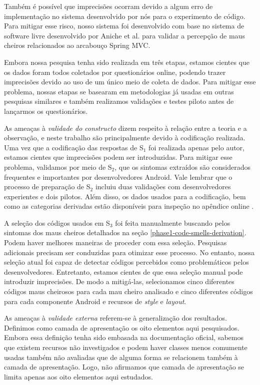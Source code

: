 Também é possível que imprecisões ocorram devido a algum erro de implementação no sistema desenvolvido por nós para o experimento de código. Para mitigar esse risco, nosso sistema foi desenvolvido com base no sistema de software livre desenvolvido por Aniche et al. \cite{AnicheSmellsMVC:17, MvcSmells:16} para validar a percepção de maus cheiros relacionados ao arcabouço Spring MVC. 

Embora nossa pesquisa tenha sido realizada em três etapas, estamos cientes que os dados foram todos coletados por questionários online, podendo trazer imprecisões devido ao uso de um único meio de coleta de dados. Para mitigar esse problema, nossas etapas se basearam em metodologias já usadas em outras pesquisas similares e também realizamos validações e testes piloto antes de lançarmos os questionários. 

As ameaças à \textit{validade do constructo} dizem respeito à relação entre a teoria e a observação, e neste trabalho são principalmente devido à codificação realizada. Uma vez que a codificação das respostas de S$_1$ foi realizada apenas pelo autor, estamos cientes que imprecisões podem ser introduzidas. Para mitigar esse problema, validamos por meio de S$_2$, que os sintomas extraídos são considerados frequentes e importantes por desenvolvedores Android. Vale lembrar que o processo de preparação de S$_2$ incluiu duas validações com desenvolvedores experientes e dois pilotos. Além disso, os dados usados para a codificação, bem como as categorias derivadas estão disponíveis para inspeção no apêndice online \cite{apendice}.

A seleção dos códigos usados em S$_3$ foi feita manualmente buscando pelos sintomas dos maus cheiros detalhados na seção \ref{phase1-code-smells-derivation}. Podem haver melhores maneiras de proceder com essa seleção. Pesquisas adicionais precisam ser conduzidas para otimizar esse processo. No entanto, nossa seleção atual foi capaz de detectar códigos percebidos como problemáticos pelos desenvolvedores. Entretanto, estamos cientes de que essa seleção manual pode introduzir imprecisões. De modo a mitigá-las, selecionamos cinco diferentes códigos maus cheirosos para cada mau cheiro analisado e cinco diferentes códigos para cada componente Android e recursos de \textit{style} e \textit{layout}. 

As ameaças à \textit{validade externa} referem-se à generalização dos resultados. Definimos como camada de apresentação os oito elementos aqui pesquisados. Embora essa definição tenha sido embasada na documentação oficial, sabemos que existem recursos não investigados e podem haver classes menos comumente usadas também não avaliadas que de alguma forma se relacionem também à camada de apresentação. Logo, não afirmamos que camada de apresentação se limita apenas aos oito elementos aqui estudados.

